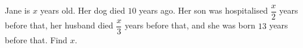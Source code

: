 Jane is $x$ years old. Her dog died $10$ years ago. Her son was hospitalised $\dfrac x2$ years before that, her husband died $\dfrac x3$ years before that, and she was born $13$ years before that. Find $x$.
